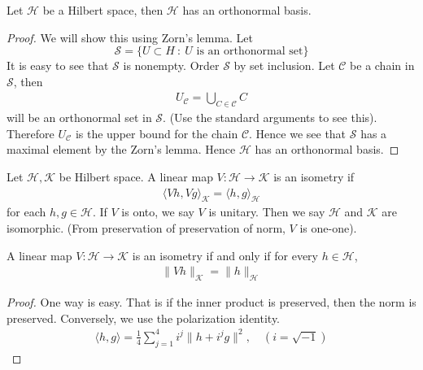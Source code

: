 \begin{theorem}
  Let $\mathcal{H}$ be a Hilbert space, then $\mathcal{H}$ has an
  orthonormal basis.
\end{theorem}
\begin{proof}
  We will show this using Zorn's lemma. Let $$\mathscr{S} = \{ U \subset H
  \ : \  U \textrm{ is an orthonormal set} \}$$
  It is easy to see that $\mathscr{S}$ is nonempty. Order
  $\mathscr{S}$ by set inclusion. Let $\mathscr{C}$ be a chain in
  $\mathscr{S}$, then
  \begin{align*}
    U_{\mathscr{C}} = \bigcup_{C \in \mathscr{C}} C
  \end{align*}
  will be an orthonormal set in $\mathscr{S}$. (Use the standard
  arguments to see this). Therefore $U_{\mathscr{C}}$ is the upper
  bound for the chain $\mathscr{C}$. Hence we see that $\mathscr{S}$ has a
  maximal element by the Zorn's lemma. Hence $\mathcal{H}$ has an
  orthonormal basis.
\end{proof}

\begin{definition}
  Let $\mathcal{H}, \mathcal{K}$ be Hilbert space. A linear map $V:
  \mathcal{H} \to \mathcal{K}$ is an isometry if
  \begin{align*}
    \langle Vh , Vg \rangle_{\mathcal{K}} = \langle h , g \rangle_{
    \mathcal{H}}
  \end{align*}
  for each $h, g \in \mathcal{H}$.
  If $V$ is onto, we say $V$ is unitary. Then we say $\mathcal{H}$
  and $\mathcal{K}$ are isomorphic.
  (From preservation of preservation of norm, $V$ is one-one).
\end{definition}

\begin{proposition}
  A linear map $V: \mathcal{H} \to \mathcal{K}$ is an isometry if and
  only if for every $h \in \mathcal{H}$,
  \begin{align*}
    \|Vh\|_{\mathcal{K}} = \|h\|_{\mathcal{H}}
  \end{align*}
\end{proposition}
\begin{proof}
  One way is easy. That is if the inner product is preserved, then
  the norm is preserved. Conversely, we use the polarization identity.
  \begin{align*}
    \langle h, g \rangle = \frac{1}{4}\sum_{j = 1}^{4} i^j\|h + i^j
    g\|^2,  \quad ( i = \sqrt{-1})
  \end{align*}
\end{proof}

